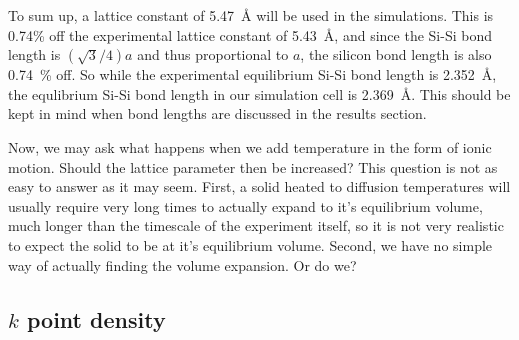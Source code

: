 \documentclass[11pt,bibliography=totoc,index=totoc]{scrbook}   %
\begin{document}

To sum up, a lattice constant of 5.47~Å  will be used in the simulations. 
This is 0.74\% off the experimental lattice constant of 5.43~Å, and since the Si-Si bond length is $(\sqrt{3}/4)a$ and thus proportional to $a$, 
the silicon bond length is also 0.74~\% off.
So while the experimental equilibrium Si-Si bond length is \SI{2.352}{\angstrom}, the equlibrium Si-Si bond length in our simulation cell is \SI{2.369}{\angstrom}.
This should be kept in mind when bond lengths are discussed in the results section.

Now, we may ask what happens when we add temperature in the form of ionic motion.
Should the lattice parameter then be increased? 
This question is not as easy to answer as it may seem.
First, a solid heated to diffusion temperatures will usually require very long times to actually expand to it's equilibrium volume, much longer than the timescale of the experiment itself, so it is not very realistic to expect the solid to be at it's equilibrium volume.
Second, we have no simple way of actually finding the volume expansion. Or do we?




%
\subsection{$k$ point density}\label{sec:parameters:k}
%
\end{document}
